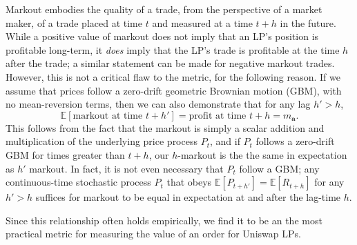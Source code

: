     Markout embodies the quality of a trade, from the perspective of a market maker, of a trade placed at time $t$ and measured at a time $t+h$ in the future. While a positive value of markout does not imply that an LP's position is profitable long-term, it \textit{does} imply that the LP's trade is profitable at the time $h$ after the trade; a similar statement can be made for negative markout trades. However, this is not a critical flaw to the metric, for the following reason. If we assume that prices follow a zero-drift geometric Brownian motion (GBM), with no mean-reversion terms, then we can also demonstrate that for any lag $h' > h$, $$\mathbb E[\text{markout at time } t + h'] = \text{profit at time } t+h = m_\textbf{a}.$$ %
    This follows from the fact that the markout is simply a scalar addition and multiplication of the underlying price process $P_t$, and if $P_t$ follows a zero-drift GBM for times greater than $t+h$, our $h$-markout is the the same in expectation as $h'$ markout. In fact, it is not even necessary that $P_t$ follow a GBM; any continuous-time stochastic process $P_t$ that obeys $\mathbb E[P_{t+h'}] = \mathbb E[R_{t+h}]$ for any $h' > h$ suffices for markout to be equal in expectation at and after the lag-time $h$.

    Since this relationship often holds empirically, we find it to be an the most practical metric for measuring the value of an order for Uniswap LPs.



